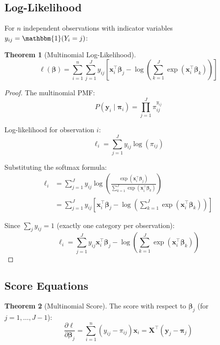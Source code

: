 \documentclass[11pt,letterpaper]{article}
\theoremstyle{definition}
\newtheorem{theorem}{Theorem}[section]
\newcommand{\X}{\mathbf{X}}
\newcommand{\y}{\mathbf{y}}
\newcommand{\bb}{\boldsymbol{\beta}}
\newcommand{\pp}{\boldsymbol{\pi}}
\begin{document}
\subsection{Log-Likelihood}

For $n$ independent observations with indicator variables $y_{ij} = \mathbbm{1}(Y_i = j)$:

\begin{theorem}[Multinomial Log-Likelihood]
\begin{equation}
    \ell(\bb) = \sum_{i=1}^{n} \sum_{j=1}^{J} y_{ij} \left[ \mathbf{x}_i^\top \bb_j - \log\left(\sum_{k=1}^{J} \exp(\mathbf{x}_i^\top \bb_k)\right) \right]
    \label{eq:multinom-loglik}
\end{equation}
\end{theorem}

\begin{proof}
The multinomial PMF:
\begin{equation}
    P(\mathbf{y}_i \mid \pp_i) = \prod_{j=1}^{J} \pi_{ij}^{y_{ij}}
\end{equation}

Log-likelihood for observation $i$:
\begin{equation}
    \ell_i = \sum_{j=1}^{J} y_{ij} \log(\pi_{ij})
\end{equation}

Substituting the softmax formula:
\begin{align}
    \ell_i &= \sum_{j=1}^{J} y_{ij} \log\left(\frac{\exp(\mathbf{x}_i^\top \bb_j)}{\sum_{k=1}^{J} \exp(\mathbf{x}_i^\top \bb_k)}\right) \\
    &= \sum_{j=1}^{J} y_{ij} \left[ \mathbf{x}_i^\top \bb_j - \log\left(\sum_{k=1}^{J} \exp(\mathbf{x}_i^\top \bb_k)\right) \right]
\end{align}

Since $\sum_j y_{ij} = 1$ (exactly one category per observation):
\begin{equation}
    \ell_i = \sum_{j=1}^{J} y_{ij} \mathbf{x}_i^\top \bb_j - \log\left(\sum_{k=1}^{J} \exp(\mathbf{x}_i^\top \bb_k)\right)
\end{equation}
\end{proof}

\subsection{Score Equations}

\begin{theorem}[Multinomial Score]
The score with respect to $\bb_j$ (for $j = 1, \ldots, J-1$):
\begin{equation}
    \frac{\partial \ell}{\partial \bb_j} = \sum_{i=1}^{n} (y_{ij} - \pi_{ij}) \mathbf{x}_i = \X^\top (\y_j - \pp_j)
    \label{eq:multinom-score}
\end{equation}
\end{theorem}
\end{document}
